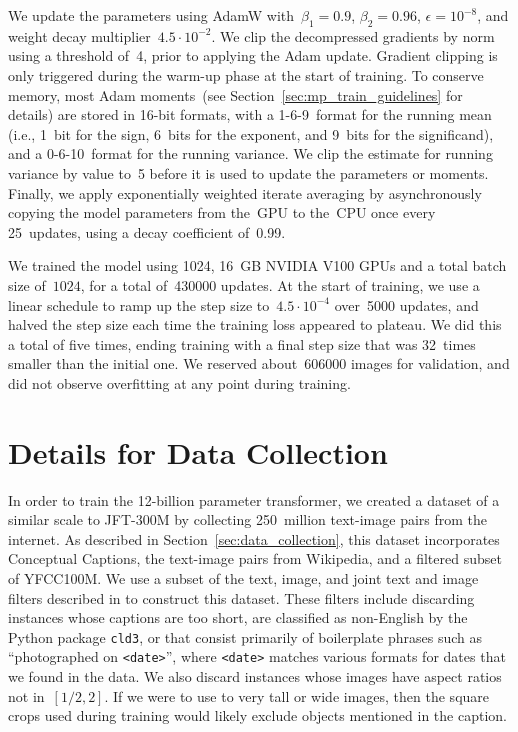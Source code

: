 \documentclass{article}
\begin{document}
We update the parameters using AdamW with~$\beta_1 = 0.9$, $\beta_2 = 0.96$, $\epsilon = 10^{-8}$, and weight decay multiplier~$4.5 \cdot 10^{-2}$. We clip the decompressed gradients by norm using a threshold of~4, prior to applying the Adam update. Gradient clipping is only triggered during the warm-up phase at the start of training. To conserve memory, most Adam moments~(see Section~\ref{sec:mp_train_guidelines} for details) are stored in 16-bit formats, with a 1-6-9~format for the running mean (i.e., 1~bit for the sign, 6~bits for the exponent, and 9~bits for the significand), and a 0-6-10~format for the running variance. We clip the estimate for running variance by value to~5 before it is used to update the parameters or moments. Finally, we apply exponentially weighted iterate averaging by asynchronously copying the model parameters from the~GPU to the~CPU once every 25~updates, using a decay coefficient of~0.99.

We trained the model using 1024, 16~GB NVIDIA V100 GPUs and a total batch size of~$1024$, for a total of~\num{430000} updates. At the start of training, we use a linear schedule to ramp up the step size to~$4.5 \cdot 10^{-4}$ over~\num{5000} updates, and halved the step size each time the training loss appeared to plateau. We did this a total of five times, ending training with a final step size that was 32~times smaller than the initial one. We reserved about~\num{606000} images for validation, and did not observe overfitting at any point during training.

\section{Details for Data Collection}
\label{sec:data_collection_details}

In order to train the 12-billion parameter transformer, we created a dataset of a similar scale to JFT-300M by collecting 250~million text-image pairs from the internet. As described in Section~\ref{sec:data_collection}, this dataset incorporates Conceptual Captions, the text-image pairs from Wikipedia, and a filtered subset of YFCC100M. We use a subset of the text, image, and joint text and image filters described in \citet{sharma2018conceptual} to construct this dataset. These filters include discarding instances whose captions are too short, are classified as non-English by the Python package \texttt{cld3}, or that consist primarily of boilerplate phrases such as ``photographed on \texttt{<date>}'', where \texttt{<date>} matches various formats for dates that we found in the data. We also discard instances whose images have aspect ratios not in~$[1 / 2, 2]$. If we were to use to very tall or wide images, then the square crops used during training would likely exclude objects mentioned in the caption.
\end{document}
